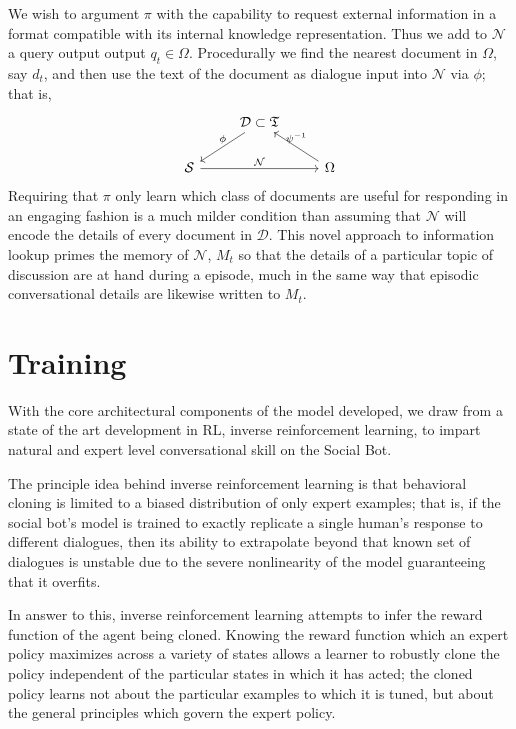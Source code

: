 \documentclass{article} %
\theoremstyle{named}
\def\scriptd{{\mathcal D}}
\def\scriptn{{\mathcal N}}
\def\scripts{{\mathcal S}}
\begin{document}
\begin{enumerate}
We wish to argument $ \pi $ with the capability to request external information in a format compatible with its internal knowledge representation. Thus we add to $\scriptn$ a query output output $ q_t \in \Omega $. Procedurally we find the nearest document in $\Omega$, say $d_t$, and then use the text of the document as dialogue input into $\scriptn$ via $\phi$; that is,
\begin{equation*}
  \begin{tikzcd}
    & \scriptd \subset \mathfrak{T} \arrow{ld}[above]{\phi} & \\
    \scripts \arrow{rr}{\scriptn} & & \Omega \arrow{lu}[above]{\psi^{-1}}
  \end{tikzcd}
\end{equation*}
Requiring that $\pi$ only learn which class of documents are useful for responding in an engaging fashion is a much milder condition than assuming that $\scriptn$ will encode the details of every document in $\scriptd$. This novel approach to information lookup primes the memory of $\scriptn$, $M_t$ so that the details of a particular topic of discussion are at hand during a  episode, much in the same way that episodic conversational details are likewise written to $M_t$.
\end{enumerate}

\section{Training}
With the core architectural components of the model developed, we draw from a state of the art development in RL, inverse reinforcement learning\cite{ng2000algorithms}, to impart natural and expert level conversational skill on the Social Bot.

The principle idea behind inverse reinforcement learning is that behavioral cloning is limited to a biased distribution of only expert examples; that is, if the social bot’s model is trained to exactly replicate a single human's response to different dialogues, then its ability to extrapolate beyond that known set of dialogues is unstable due to the severe nonlinearity of the model guaranteeing that it overfits.

In answer to this, inverse reinforcement learning attempts to infer the reward function of the agent being cloned. Knowing the reward function which an expert policy maximizes across a variety of states allows a learner to robustly clone the policy independent of the particular states in which it has acted; the cloned policy learns not about the particular examples to which it is tuned, but about the general principles which govern the expert policy.
\end{document}
